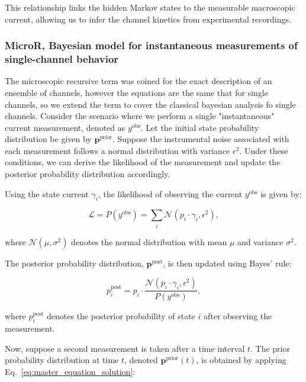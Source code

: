 \documentclass[pdflatex,sn-mathphys-num]{sn-jnl}%
\theoremstyle{thmstyleone}%
\theoremstyle{thmstyletwo}%
\theoremstyle{thmstylethree}%
\begin{document}
This relationship links the hidden Markov states to the measurable macroscopic current, allowing us to infer the channel kinetics from experimental recordings.



\subsubsection{MicroR, Bayesian model for instantaneous measurements of single-channel behavior}

The microscopic recursive term was coined for the exact description of an ensemble of channels, however the equations are the same that for single channels, so we extend the term to cover the classical bayesian analysis fo single channels. 
Consider the scenario where we perform a single "instantaneous" current measurement, denoted as \( y^{\text{obs}} \). Let the initial state probability distribution be given by \( \boldsymbol{p}^{\text{prior}} \). Suppose the instrumental noise associated with each measurement follows a normal distribution with variance \( \epsilon^2 \). Under these conditions, we can derive the likelihood of the measurement and update the posterior probability distribution accordingly.

Using the state current $\gamma_i$, the likelihood of observing the current \( y^{\text{obs}} \) is given by:

\begin{equation}
	\mathcal{L} = P(y^{\text{obs}}) = \sum_i \mathcal{N}(p_i \cdot \gamma_i, \epsilon^2),
	\label{eq:single_channel_likelihood}
\end{equation}

where \( \mathcal{N}(\mu, \sigma^2) \) denotes the normal distribution with mean \( \mu \) and variance \( \sigma^2 \).

The posterior probability distribution, \( \boldsymbol{p}^{\text{post}} \), is then updated using Bayes' rule:

\begin{equation}
	p^{\text{post}}_i = p_i \cdot \frac{\mathcal{N}(p_i \cdot \gamma_i, \epsilon^2)}{P(y^{\text{obs}})},
	\label{eq:single_channel_posterior}
\end{equation}

where \( p^{\text{post}}_i \) denotes the posterior probability of state \( i \) after observing the measurement.

Now, suppose a second measurement is taken after a time interval \( t \). The prior probability distribution at time \( t \), denoted \( \boldsymbol{p}^{\text{prior}}(t) \), is obtained by applying Eq.~\ref{eq:master_equation_solution}:
\end{document}
